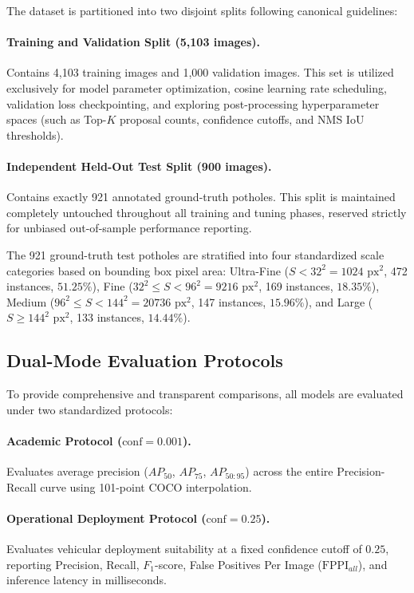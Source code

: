 \documentclass[runningheads]{llncs}
\begin{document}
The dataset is partitioned into two disjoint splits following canonical guidelines:
\paragraph{Training and Validation Split (5,103 images).} Contains 4,103 training images and 1,000 validation images. This set is utilized exclusively for model parameter optimization, cosine learning rate scheduling, validation loss checkpointing, and exploring post-processing hyperparameter spaces (such as Top-$K$ proposal counts, confidence cutoffs, and NMS IoU thresholds).
\paragraph{Independent Held-Out Test Split (900 images).} Contains exactly 921 annotated ground-truth potholes. This split is maintained completely untouched throughout all training and tuning phases, reserved strictly for unbiased out-of-sample performance reporting.

The 921 ground-truth test potholes are stratified into four standardized scale categories based on bounding box pixel area:
Ultra-Fine ($S < 32^2 = 1024\text{ px}^2$, 472 instances, $51.25\%$),
Fine ($32^2 \le S < 96^2 = 9216\text{ px}^2$, 169 instances, $18.35\%$),
Medium ($96^2 \le S < 144^2 = 20736\text{ px}^2$, 147 instances, $15.96\%$), and
Large ($S \ge 144^2\text{ px}^2$, 133 instances, $14.44\%$).

\subsection{Dual-Mode Evaluation Protocols}
To provide comprehensive and transparent comparisons, all models are evaluated under two standardized protocols:
\paragraph{Academic Protocol ($\text{conf} = 0.001$).} Evaluates average precision ($AP_{50}$, $AP_{75}$, $AP_{50:95}$) across the entire Precision-Recall curve using 101-point COCO interpolation.
\paragraph{Operational Deployment Protocol ($\text{conf} = 0.25$).} Evaluates vehicular deployment suitability at a fixed confidence cutoff of $0.25$, reporting Precision, Recall, $F_1$-score, False Positives Per Image ($\text{FPPI}_{all}$), and inference latency in milliseconds.
\end{document}
